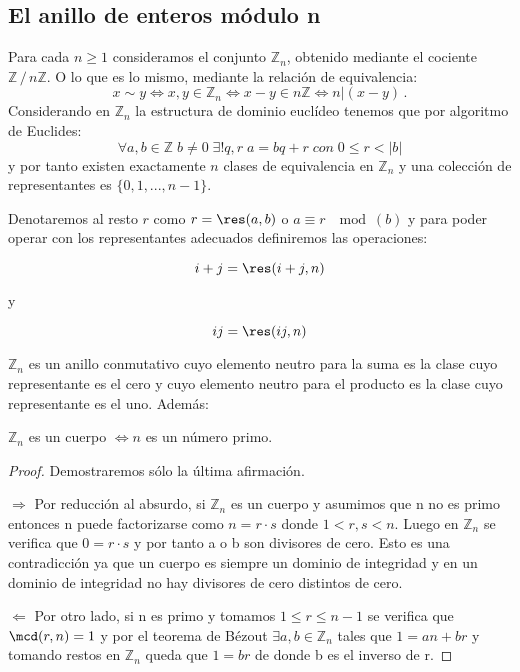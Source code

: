 \subsection{El anillo de enteros módulo n}

Para cada $n \ge 1$ consideramos el conjunto $\mathbb{Z}_n$, obtenido mediante el cociente $\mathbb{Z}\,/\,n\mathbb{Z}$. O lo que es lo mismo, mediante la relación de equivalencia:
\begin{equation*}
	x \sim y \iff x,y \in \mathbb{Z}_n \iff x-y \in n\mathbb{Z} \iff n | (x-y)\,.
\end{equation*}
Considerando en $\mathbb{Z}_n$ la estructura de dominio euclídeo tenemos que por algoritmo de Euclides: $$\forall a,b \in \mathbb{Z} \; b \neq 0 \; \exists! q,r \; a = bq+r \; con \; 0 \leq r < |b| $$ y por tanto existen exactamente $n$ clases de equivalencia en $\mathbb{Z}_n$ y una colección de representantes es $\{0,1,...,n-1\}$.

Denotaremos al resto $r$ como $r = \res(a,b)$ o $a \equiv r \; \mod(b)$ y para poder operar con los representantes adecuados definiremos las operaciones:

$$i+j = \res(i+j,n)$$

y

$$ij = \res(ij,n)$$

\begin{nprop}
$\mathbb{Z}_n$ es un anillo conmutativo cuyo elemento neutro para la suma es la clase cuyo representante es el cero y cuyo elemento neutro para el producto es la clase cuyo representante es el uno. Además:

$\mathbb{Z}_n$ es un cuerpo $\iff n$ es un número primo.
\end{nprop}

\begin{proof}

Demostraremos sólo la última afirmación. 

$\Rightarrow$ Por reducción al absurdo, si $\mathbb{Z}_n$ es un cuerpo y asumimos que n no es primo entonces n puede factorizarse como $n = r \cdot s$ donde $1 < r,s < n$. Luego en $\mathbb{Z}_n$ se verifica que $0 = r \cdot s$ y por tanto a o b son divisores de cero. Esto es una contradicción ya que un cuerpo es siempre un dominio de integridad y en un dominio de integridad no hay divisores de cero distintos de cero.

$\Leftarrow$ Por otro lado, si n es primo y tomamos $1 \leq r \leq n-1$ se verifica que $\mcd(r,n) = 1$ y por el teorema de Bézout $\exists a,b \in \mathbb{Z}_n$ tales que $1 = an + br$ y tomando restos en $\mathbb{Z}_n$ queda que $1 = br$ de donde b es el inverso de r.

\end{proof}

